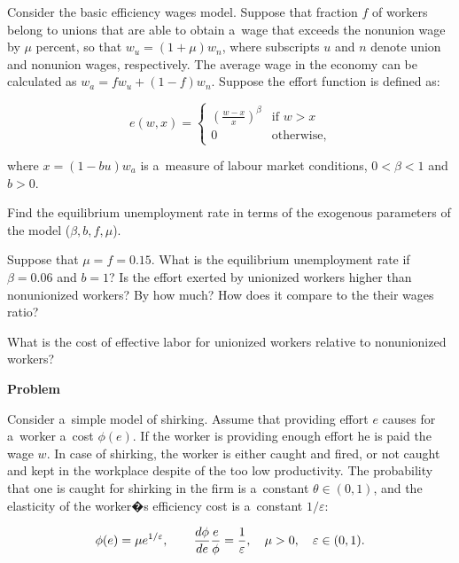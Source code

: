 \documentclass[a4paper, notitlepage, 11pt]{article}
\newcounter{zadlicz}[section]%
\newcommand{\tytul}[2]{\setcounter{equation}{0}\addtocounter{zadlicz}{1}\vspace{\abovedisplayskip}\noindent\textbf{#1\ \thezadlicz #2}}%
\begin{document}
\noindent%
Consider the basic efficiency wages model. Suppose that fraction $f$ of workers belong to unions that are able to obtain a~wage that exceeds the nonunion wage by $\mu$ percent, so that $w_u=(1+\mu)w_n$, where subscripts $u$ and $n$ denote union and nonunion wages, respectively. The average wage in the economy can be calculated as $w_a=fw_u+(1-f)w_n$. Suppose the effort function is defined as:

\[
e(w,x)=\label{example_9.12}
\begin{cases}
 \left(\frac{w-x}{x}\right)^\beta & \text{if } w>x \\
 0                                & \text{otherwise},
\end{cases}
\]

where  $x = (1-bu)w_a$ is a~measure of labour market conditions, $0<\beta<1$ and $b>0$.

\begin{wylicz}
\item Find the equilibrium unemployment rate in terms of the exogenous parameters of the model ($\beta,b,f,\mu$).
\item Suppose that $\mu=f=0.15$. What is the equilibrium unemployment rate if $\beta=0.06$ and $b=1$? Is the effort exerted by unionized workers higher than nonunionized workers? By how much? How does it compare to the their wages ratio?
\item What is the cost of effective labor for unionized workers relative to nonunionized workers?
\end{wylicz}

\tytul{Problem}{}

\noindent%
Consider a~simple model of shirking. Assume that providing effort $e$ causes for a~worker a~cost $\phi(e)$. If the worker is providing enough effort he is paid the wage $w$. In case of shirking, the worker is either caught and fired, or not caught and kept in the workplace despite of the too low productivity. The probability that one is caught for shirking in the firm is a~constant $\theta\in (0, 1)$, and the elasticity of the worker�s efficiency cost is a~constant $1/\varepsilon$:

\begin{equation}
\phi(e)=\mu e^{1/\varepsilon},\qquad \frac{d\phi}{de}\frac{e}{\phi}=\frac{1}{\varepsilon},\quad \mu>0,\quad \varepsilon\in (0,1).\label{phi}\notag
\end{equation}
\end{document}
